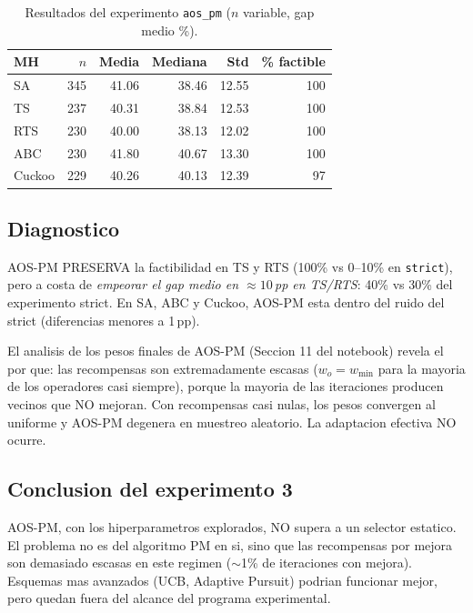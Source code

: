 \begin{table}[h]
\centering
\caption{Resultados del experimento \texttt{aos\_pm} ($n$ variable, gap medio \%).}
\label{tab:aos-resultados}
\small
\begin{tabular}{lrrrrr}
\toprule
MH & $n$ & Media & Mediana & Std & \% factible \\
\midrule
SA      & 345 & 41.06 & 38.46 & 12.55 & 100 \\
TS      & 237 & 40.31 & 38.84 & 12.53 & 100 \\
RTS     & 230 & 40.00 & 38.13 & 12.02 & 100 \\
ABC     & 230 & 41.80 & 40.67 & 13.30 & 100 \\
Cuckoo  & 229 & 40.26 & 40.13 & 12.39 & 97 \\
\bottomrule
\end{tabular}
\end{table}

\subsection{Diagnostico}

AOS-PM PRESERVA la factibilidad en TS y RTS (100\% vs 0--10\% en
\texttt{strict}), pero a costa de \emph{empeorar el gap medio en
$\approx 10$\,pp en TS/RTS}: 40\% vs 30\% del experimento strict. En
SA, ABC y Cuckoo, AOS-PM esta dentro del ruido del strict (diferencias
menores a 1\,pp).

El analisis de los pesos finales de AOS-PM (Seccion 11 del notebook)
revela el por que: las recompensas son extremadamente escasas
($w_o = w_{\min}$ para la mayoria de los operadores casi siempre),
porque la mayoria de las iteraciones producen vecinos que NO mejoran.
Con recompensas casi nulas, los pesos convergen al uniforme y AOS-PM
degenera en muestreo aleatorio. La adaptacion efectiva NO ocurre.

\subsection{Conclusion del experimento 3}

AOS-PM, con los hiperparametros explorados, NO supera a un selector
estatico. El problema no es del algoritmo PM en si, sino que las
recompensas por mejora son demasiado escasas en este regimen ($\sim$1\%
de iteraciones con mejora). Esquemas mas avanzados (UCB, Adaptive
Pursuit) podrian funcionar mejor, pero quedan fuera del alcance del
programa experimental.

